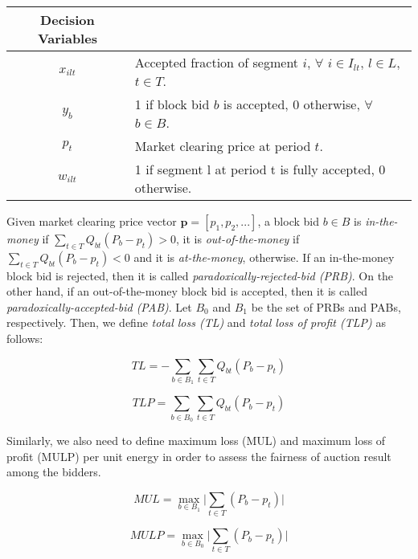 \documentclass[conference]{IEEEtran}
\begin{document}
\begin {table}[h!]
\begin{tabular}{c l}
Decision Variables &\\
\hline
$x_{ilt}$ & Accepted fraction of segment $i$, $\forall$ $i\in I_{lt}$, $l \in L$, $t\in T$. \\
$y_b$ & 1 if block bid $b$ is accepted, 0 otherwise, $\forall$ $b\in B $.\\
$p_t$ & Market clearing price at period $t$. \\
$w_{ilt}$ & 1 if segment l at period t is fully accepted, 0 otherwise.\\
\end{tabular}
\end{table}

Given market clearing price vector $\textbf{p}=[p_1, p_2, ...]$, a block bid $b \in B$ is \textit{in-the-money} if $\sum\limits_{t \in T} Q_{bt}(P_b - p_t)>0$, it is \textit{out-of-the-money} if $\sum\limits_{t \in T} Q_{bt}(P_b - p_t)<0$ and it is \textit{at-the-money}, otherwise. If an in-the-money block bid is rejected, then it is called \textit{paradoxically-rejected-bid (PRB)}. On the other hand, if an out-of-the-money block bid is accepted, then it is called \textit{paradoxically-accepted-bid (PAB)}. Let $B_0$ and $B_1$ be the set of PRBs and PABs, respectively. Then, we define \textit{total loss (TL)} and \textit{total loss of profit (TLP)} as follows:  

\begin{equation}
     TL=-\sum\limits_{b\in B_1} \sum\limits_{t \in T} Q_{bt}(P_b - p_t)
\end{equation}

\begin{equation}
     TLP=\sum\limits_{b\in B_0} \sum\limits_{t \in T} Q_{bt}(P_b - p_t)
\end{equation}

Similarly, we also need to define maximum loss (MUL) and maximum loss of profit (MULP) per unit energy in order to assess the fairness of auction result among the bidders.

\begin{equation}
     MUL=\max\limits_{b\in B_1} \big| \sum\limits_{t \in T} (P_b - p_t)\big|
\end{equation}

\begin{equation}
     MULP=\max\limits_{b\in B_0} \big| \sum\limits_{t \in T} (P_b - p_t) \big|
\end{equation}
\end{document}
